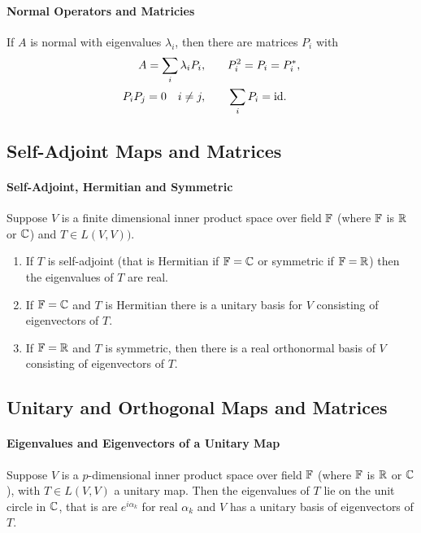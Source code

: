 \paragraph{Normal Operators and Matricies}
If \(A\) is normal with eigenvalues \(\lambda_i\), then there are matrices \(P_i\) with
\begin{align*}
    A = \sum_i \lambda_iP_i, & \qquad P_i^2 = P_i = P_i^*, \\
    P_iP_j = 0 \quad i \neq j, & \qquad \sum_i P_i = \mathrm{id}.
\end{align*}

\subsection{Self-Adjoint Maps and Matrices}
\paragraph{Self-Adjoint, Hermitian and Symmetric}
Suppose \(V\) is a finite dimensional inner product space over field \(\mathbb{F}\) (where \(\mathbb{F}\) is \(\mathbb{R}\) or \(\mathbb{C}\)) and \(T \in L(V,V))\).
\begin{enumerate}[label=\alph*)]
    \item If \(T\) is self-adjoint (that is Hermitian if \(\mathbb{F} = \mathbb{C}\) or symmetric if \(\mathbb{F} = \mathbb{R}\)) then the eigenvalues of \(T\) are real.
    \item If \(\mathbb{F} = \mathbb{C}\) and \(T\) is Hermitian there is a unitary basis for \(V\) consisting of eigenvectors of \(T\).
    \item If \(\mathbb{F} = \mathbb{R}\) and \(T\) is symmetric, then there is a real orthonormal basis of \(V\) consisting of eigenvectors of \(T\). 
\end{enumerate} 

\subsection{Unitary and Orthogonal Maps and Matrices}
\paragraph{Eigenvalues and Eigenvectors of a Unitary Map}
Suppose \(V\) is a \(p\)-dimensional inner product space over field \(\mathbb{F}\) (where \(\mathbb{F}\) is \(\mathbb{R}\) or \(\mathbb{C}\)), with \(T \in L(V,V)\) a unitary map. Then the eigenvalues of \(T\) lie on the unit circle in \(\mathbb{C}\), that is are \(e^{i\alpha_k}\) for real \(\alpha_k\) and \(V\) has a unitary basis of eigenvectors of \(T\). 

